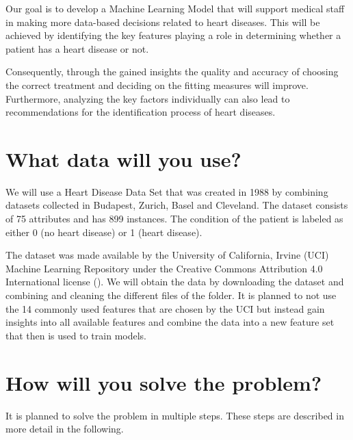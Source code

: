\documentclass[11pt,titlepage,oneside,openany]{article}
\begin{document}
Our goal is to develop a Machine Learning Model that will support medical staff in making more data-based decisions related to heart diseases. This will be achieved by identifying the key features playing a role in determining whether a patient has a heart disease or not. 

Consequently, through the gained insights the quality and accuracy of choosing the correct treatment and deciding on the fitting measures will improve. Furthermore, analyzing the key factors individually can also lead to recommendations for the identification process of heart diseases. 


\section{What data will you use?}
\label{sec:data}

We will use a Heart Disease Data Set that was created in 1988 by combining datasets collected in Budapest, Zurich, Basel and Cleveland. The dataset consists of 75 attributes and has 899 instances. The condition of the patient is labeled as either 0 (no heart disease) or 1 (heart disease).

The dataset was made available by the University of California, Irvine (UCI) Machine Learning Repository under the Creative Commons Attribution 4.0 International license (\cite{janosi1988}). We will obtain the data by downloading the dataset and combining and cleaning the different files of the folder. It is planned to not use the 14 commonly used features that are chosen by the UCI but instead gain insights into all available features and combine the data into a new feature set that then is used to train models. 

\section{How will you solve the problem?}
\label{cha:solve}

It is planned to solve the problem in multiple steps. These steps are described in more detail in the following. 
\end{document}
